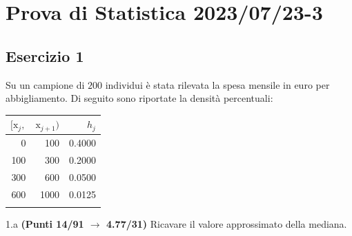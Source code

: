 \documentclass[
  11pt,
]{book}
\theoremstyle{mytheoremstyle}
\theoremstyle{mydefstyle}
\begin{document}
\section{Prova di Statistica 2023/07/23-3}\label{prova-di-statistica-20230723-3}

\subsection{Esercizio 1}\label{esercizio-1-33}

Su un campione di \(200\) individui è stata rilevata la spesa mensile in euro per abbigliamento. Di seguito sono riportate la densità percentuali:

\begin{table}[H]
\centering
\begin{tabular}{rrr}
\toprule
$[\text{x}_j,$ & $\text{x}_{j+1})$ & $h_j$\\
\midrule
0 & 100 & 0.4000\\
100 & 300 & 0.2000\\
300 & 600 & 0.0500\\
600 & 1000 & 0.0125\\
 &  & \\
\bottomrule
\end{tabular}
\end{table}

1.a \textbf{(Punti 14/91 \(\rightarrow\) 4.77/31)} Ricavare il valore approssimato della mediana.
\end{document}
